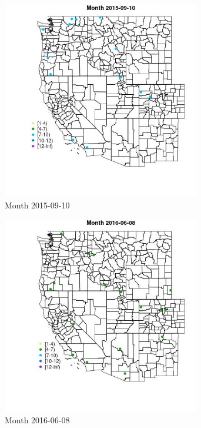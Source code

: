 \begin{figure} 
\centering  
\includegraphics[width=0.77\textwidth]{Code_Outputs/Report_ML_input_PM25_Step4_part_e_de_duplicated_aves_MapObsMonth2015-09-10.jpg} 
\caption{\label{fig:Report_ML_input_PM25_Step4_part_e_de_duplicated_avesMapObsMonth2015-09-10}Month 2015-09-10} 
\end{figure} 
 

\begin{figure} 
\centering  
\includegraphics[width=0.77\textwidth]{Code_Outputs/Report_ML_input_PM25_Step4_part_e_de_duplicated_aves_MapObsMonth2016-06-08.jpg} 
\caption{\label{fig:Report_ML_input_PM25_Step4_part_e_de_duplicated_avesMapObsMonth2016-06-08}Month 2016-06-08} 
\end{figure} 
 

